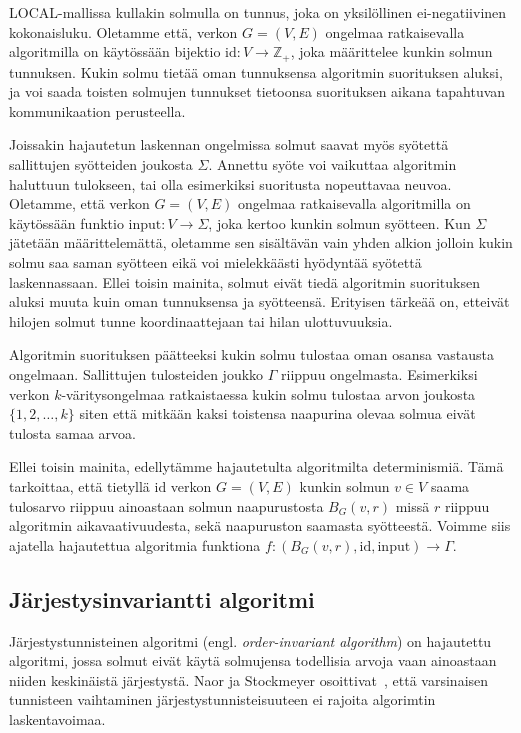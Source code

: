 \documentclass[12pt,finnish]{tktltiki2}
\theoremstyle{definition}
\theoremstyle{remark}
\begin{document}
LOCAL-mallissa kullakin solmulla on tunnus, joka on yksilöllinen ei-negatiivinen kokonaisluku. Oletamme että, verkon $G = (V, E)$ ongelmaa ratkaisevalla algoritmilla on käytössään bijektio $\text{id}: V \rightarrow \mathbb{Z}_+$, joka määrittelee kunkin solmun tunnuksen. Kukin solmu tietää oman tunnuksensa algoritmin suorituksen aluksi, ja voi saada toisten solmujen tunnukset tietoonsa suorituksen aikana tapahtuvan kommunikaation perusteella.

Joissakin hajautetun laskennan ongelmissa solmut saavat myös syötettä sallittujen syötteiden joukosta $\Sigma$. Annettu syöte voi vaikuttaa algoritmin haluttuun tulokseen, tai olla esimerkiksi suoritusta nopeuttavaa neuvoa. Oletamme, että verkon $G = (V, E)$ ongelmaa ratkaisevalla algoritmilla on käytössään funktio $\text{input}: V \rightarrow \Sigma$, joka kertoo kunkin solmun syötteen. Kun $\Sigma$ jätetään määrittelemättä, oletamme sen sisältävän vain yhden alkion jolloin kukin solmu saa saman syötteen eikä voi mielekkäästi hyödyntää syötettä laskennassaan. Ellei toisin mainita, solmut eivät tiedä algoritmin suorituksen aluksi muuta kuin oman tunnuksensa ja syötteensä. Erityisen tärkeää on, etteivät hilojen solmut tunne koordinaattejaan tai hilan ulottuvuuksia.

Algoritmin suorituksen päätteeksi kukin solmu tulostaa oman osansa vastausta ongelmaan. Sallittujen tulosteiden joukko $\Gamma$ riippuu ongelmasta. Esimerkiksi verkon $k$-väritysongelmaa ratkaistaessa kukin solmu tulostaa arvon joukosta $\{1, 2, \ldots, k\}$ siten että mitkään kaksi toistensa naapurina olevaa solmua eivät tulosta samaa arvoa.

Ellei toisin mainita, edellytämme hajautetulta algoritmilta determinismiä. Tämä tarkoittaa, että tietyllä $\text{id}$ verkon $G = (V, E)$ kunkin solmun $v \in V$ saama tulosarvo riippuu ainoastaan solmun naapurustosta $B_G(v, r)$ missä $r$ riippuu algoritmin aikavaativuudesta, sekä naapuruston saamasta syötteestä. Voimme siis ajatella hajautettua algoritmia funktiona $f: (B_G(v, r), \text{id}, \text{input}) \rightarrow \Gamma$.


\subsection{Järjestysinvariantti algoritmi}
Järjestystunnisteinen algoritmi (engl. \textit{order-invariant algorithm}) on hajautettu algoritmi, jossa solmut eivät käytä solmujensa todellisia arvoja vaan ainoastaan niiden keskinäistä järjestystä. Naor ja Stockmeyer osoittivat~\cite{naor95}, että varsinaisen tunnisteen vaihtaminen järjestystunnisteisuuteen ei rajoita algorimtin laskentavoimaa.
\end{document}
